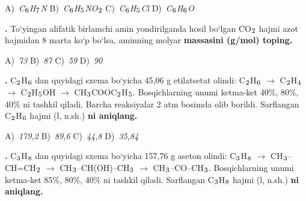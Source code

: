 \documentclass[11pt,a4paper]{article}
\renewcommand{\textsubscript}[1]{\ensuremath{_{\text{\fontsize{8}{8}\selectfont #1}}}}
\newcommand{\qn}[1]{\textbf{\fontsize{11.5}{13}\selectfont #1}}
\newcommand{\qsep}{\par\vspace{13pt}}
\begin{document}
\begin{multicols}{2}
\noindent A)~\textsl{C\textsubscript{6}H\textsubscript{7}N} \hfill B)~\textsl{C\textsubscript{6}H\textsubscript{5}NO\textsubscript{2}} \hfill C)~\textsl{C\textsubscript{6}H\textsubscript{5}Cl} \hfill D)~\textsl{C\textsubscript{6}H\textsubscript{6}O}\par
\qsep
\noindent\qn{27.} To`yingan alifatik birlamchi amin yondirilganda hosil bo`lgan CO\textsubscript{2} hajmi azot hajmidan 8 marta ko`p bo`lsa, aminning molyar \textbf{massasini (g/mol) toping.}

\noindent A)~\textsl{73} \hfill B)~\textsl{87} \hfill C)~\textsl{59} \hfill D)~\textsl{90}\par
\qsep
\noindent\qn{28.} C\textsubscript{2}H\textsubscript{6} dan quyidagi sxema bo`yicha 45,06 g etilatsetat olindi: C\textsubscript{2}H\textsubscript{6} $\to$ C\textsubscript{2}H\textsubscript{4} $\to$ C\textsubscript{2}H\textsubscript{5}OH $\to$ CH\textsubscript{3}COOC\textsubscript{2}H\textsubscript{5}. Bosqichlarning unumi ketma-ket 40\%, 80\%, 40\% ni tashkil qiladi. Barcha reaksiyalar 2 atm bosimda olib borildi. Sarflangan C\textsubscript{2}H\textsubscript{6} hajmi (l, n.sh.) \textbf{ni aniqlang.}

\noindent A)~\textsl{179,2} \hfill B)~\textsl{89,6} \hfill C)~\textsl{44,8} \hfill D)~\textsl{35,84}\par
\qsep
\noindent\qn{29.} C\textsubscript{3}H\textsubscript{8} dan quyidagi sxema bo`yicha 157,76 g aseton olindi: C\textsubscript{3}H\textsubscript{8} $\to$ CH\textsubscript{3}--CH=CH\textsubscript{2} $\to$ CH\textsubscript{3}--CH(OH)--CH\textsubscript{3} $\to$ CH\textsubscript{3}--CO--CH\textsubscript{3}. Bosqichlarning unumi ketma-ket 85\%, 80\%, 40\% ni tashkil qiladi. Sarflangan C\textsubscript{3}H\textsubscript{8} hajmi (l, n.sh.) \textbf{ni aniqlang.}


\end{multicols}
\end{document}
